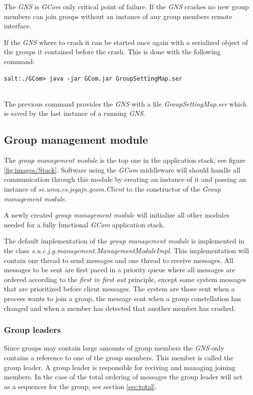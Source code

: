 \documentclass[titlepage, twocolumn, a4paper, 10pt]{article}
\begin{document}
The \textit{GNS} is \textit{GCom} only critical point of failure. If
the \textit{GNS} crashes no new group members can join groups without
an instance of any group members remote interface.

If the \textit{GNS} where to crash it can be started once again with
a serialized object of the groups it contained before the crash. This
is done with the following command:\\
\begin{footnotesize}
  \verb!salt:./GCom> java -jar GCom.jar GroupSettingMap.ser!
\end{footnotesize}\\
The previous command provides the \textit{GNS} with a file
\textit{GroupSettingMap.ser} which is saved by the last instance of a
running \textit{GNS}.

\subsection{Group management module}\label{sec:group-management-module}
The \textit{group management module} is the top one in the application
stack, see figure \ref{fig:images/Stack}. Software using the
\textit{GCom} middleware will should handle all communication through
this module by creating an instance of it and passing an instance of
\textit{se.umu.cs.jsgajn.gcom.Client} to the constructor of the
\textit{Group management module}.

A newly created \textit{group management module} will initialize all
other modules needed for a fully functional \textit{GCom} application
stack.

The default implementation of the \textit{group management module} is
implemented in the class
\textit{s.u.c.j.g.management.ManagementModuleImpl}. This
implementation will contain one thread to send messages and one thread
to receive messages. All messages to be sent are first paced in a
priority queue where all messages are ordered according to the
\textit{first in first out} principle, except some system messages
that are prioritized before client messages. The system are those sent
when a process wants to join a group, the message sent when a group
constellation has changed and when a member has detected that another
member has crashed.

\subsubsection{Group leaders}\label{sec:group-leaders}
Since groups may contain large amounts of group members the
\textit{GNS} only contains a reference to one of the group members.
This member is called the group leader. A group leader is responsible
for reciving and managing joining members. In the case of the total
ordering of messages the group leader will act as a sequencer for the
group, see section \ref{sec:total}.
\end{document}
